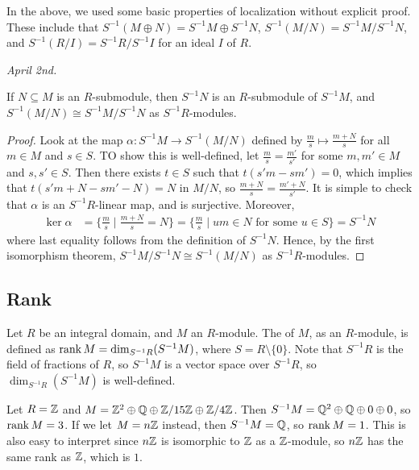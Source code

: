 In the above, we used some basic properties of localization without explicit proof. These include that $S^{-1}(M \oplus N) = S^{-1}M \oplus S^{-1}N$, $S^{-1}(M/N) = S^{-1}M/S^{-1}N$, and $S^{-1}(R/I) = S^{-1}R/S^{-1}I$ for an ideal $I$ of $R$. 

\textit{April 2nd.}

\begin{proposition}
    If $N \subseteq M$ is an $R$-submodule, then $S^{-1}N$ is an $R$-submodule of $S^{-1}M$, and $S^{-1}(M/N) \cong S^{-1}M/S^{-1}N$ as $S^{-1}R$-modules.
\end{proposition}
\begin{proof}
    Look at the map $\alpha:S^{-1}M \to S^{-1}(M/N)$ defined by $\frac{m}{s} \mapsto \frac{m+N}{s}$ for all $m \in M$ and $s \in S$. TO show this is well-defined, let $\frac{m}{s} = \frac{m'}{s'}$ for some $m,m' \in M$ and $s,s' \in S$. Then there exists $t \in S$ such that $t(s'm - sm') = 0$, which implies that $t(s'm+N - sm' - N) = N$ in $M/N$, so $\frac{m+N}{s} = \frac{m'+N}{s'}$. It is simple to check that $\alpha$ is an $S^{-1}R$-linear map, and is surjective. Moreover,
    \begin{align}
        \ker \alpha &= \{\frac{m}{s} \mid \frac{m+N}{s} = N\} = \{\frac{m}{s} \mid um \in N \text{ for some } u \in S\} = S^{-1}N
    \end{align}
    where last equality follows from the definition of $S^{-1}N$. Hence, by the first isomorphism theorem, $S^{-1}M/S^{-1}N \cong S^{-1}(M/N)$ as $S^{-1}R$-modules.
\end{proof}

\subsection{Rank}

\begin{definition}
    Let $R$ be an integral domain, and $M$ an $R$-module. The  of $M$, as an $R$-module, is defined as $\operatorname{rank} M = \dim_{S^{-1}R}(S^{-1}M)$, where $S = R \setminus \{0\}$. Note that $S^{-1}R$ is the field of fractions of $R$, so $S^{-1}M$ is a vector space over $S^{-1}R$, so $\dim_{S^{-1}R}(S^{-1}M)$ is well-defined.
\end{definition}

\begin{example}
    Let $R = \mathbb{Z}$ and $M = \mathbb{Z}^{2} \oplus \mathbb{Q} \oplus \mathbb{Z}/15\mathbb{Z} \oplus \mathbb{Z}/4\mathbb{Z}$. Then $S^{-1}M = \mathbb{Q}^{2} \oplus \mathbb{Q} \oplus 0 \oplus 0$, so $\operatorname{rank} M = 3$. If we let $M = n\mathbb{Z}$ instead, then $S^{-1}M = \mathbb{Q}$, so $\operatorname{rank} M = 1$. This is also easy to interpret since $n\mathbb{Z}$ is isomorphic to $\mathbb{Z}$ as a $\mathbb{Z}$-module, so $n\mathbb{Z}$ has the same rank as $\mathbb{Z}$, which is $1$.
\end{example}

